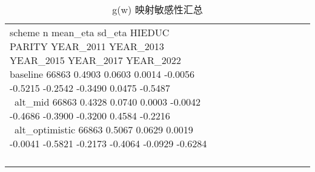 \begin{table}[htbp]
\centering
\caption{g(w) 映射敏感性汇总}
\begin{tabular}{lllllllllll}
\hline
scheme n mean\_eta sd\_eta HIEDUC PARITY YEAR\_2011 YEAR\_2013 YEAR\_2015 YEAR\_2017 YEAR\_2022 \
\hline
baseline 66863 0.4903 0.0603 0.0014 -0.0056 -0.5215 -0.2542 -0.3490 0.0475 -0.5487 \
alt_mid 66863 0.4328 0.0740 0.0003 -0.0042 -0.4686 -0.3900 -0.3200 0.4584 -0.2216 \
alt_optimistic 66863 0.5067 0.0629 0.0019 -0.0041 -0.5821 -0.2173 -0.4064 -0.0929 -0.6284 \
\hline
\end{tabular}
\end{table}